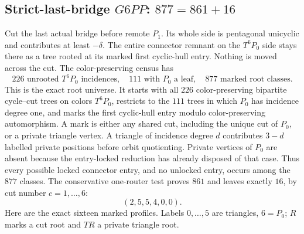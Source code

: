 \documentclass[11pt]{article}
\begin{document}
\subsection{\texorpdfstring{Strict-last-bridge $G6PP$: $877=861+16$}{Strict-last-bridge G6PP: 877=861+16}}

Cut the last actual bridge before remote $P_1$.  Its whole side is pentagonal
unicyclic and contributes at least $-\delta$.  The entire connector remnant on
the $T^6P_0$ side stays there as a tree rooted at its marked first cyclic-hull
entry.  Nothing is moved across the cut.  The color-preserving census has
\[
 226\text{ unrooted }T^6P_0\text{ incidences},\quad
 111\text{ with $P_0$ a leaf},\quad
 877\text{ marked root classes}.
\]
This is the exact root universe.  It starts with all $226$ color-preserving
bipartite cycle--cut trees on colors $T^6P_0$, restricts to the $111$ trees in
which $P_0$ has incidence degree one, and marks the first cyclic-hull entry
modulo color-preserving automorphism.  A mark is either any shared cut,
including the unique cut of $P_0$, or a private triangle vertex.  A triangle of
incidence degree $d$ contributes $3-d$ labelled private positions before orbit
quotienting.  Private vertices of $P_0$ are absent because the entry-locked
reduction has already disposed of that case.  Thus every possible locked
connector entry, and no unlocked entry, occurs among the $877$ classes.
The conservative one-router test proves $861$ and leaves exactly $16$, by cut
number $c=1,\ldots,6$:
\[
 (2,5,5,4,0,0).
\]
Here are the exact sixteen marked profiles.  Labels $0,\ldots,5$ are triangles,
$6=P_0$; $R$ marks a cut root and $TR$ a private triangle root.
\end{document}
